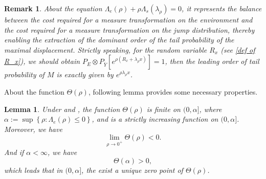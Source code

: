 \documentclass[]{article}
\numberwithin{equation}{section}
\theoremstyle{thmstyleone}%
\theoremstyle{thmstyletwo}%
\newtheorem{remark}{Remark}%
\theoremstyle{thmstylethree}%
\theoremstyle{thmstylefour}%
\newtheorem{lemma}{Lemma}
\theoremstyle{thmstylefive}%
\theoremstyle{thmstylesix}%
\begin{document}
	\begin{remark}
		About the equation $\Lambda_e(\rho)+ \rho \Lambda_s(\lambda_\rho)=0$, it represents the balance between the cost required for a measure transformation on the environment and the cost required for a measure transformation on the jump distribution, thereby enabling the extraction of the dominant order of the tail probability of the maximal displacement. Strictly speaking, for the random variable $R_x$ (see \cref{def of R_x}), we should obtain $P_E\otimes P_{\overline{Y}}\left[ e^{\rho(R_x+\lambda_\rho x)} \right] = 1$, then the leading order of tail probability of $M$ is exactly given by $e^{\rho \lambda_\rho x}$.
	\end{remark}
	
	About the function $\varTheta(\rho)$, following lemma provides some necessary properties.
	\begin{lemma}\label{Classify}
		Under and ,
		the function $\varTheta(\rho)$ is finite on $(0,\alpha]$, where $\alpha:=\sup\left\{\rho:\Lambda_e(\rho)\leqslant 0\right\}$, and is a strictly increasing function on $(0,\alpha]$. Moreover, we have 
		\begin{equation}
			\lim\limits_{\rho\rightarrow 0^+} \varTheta(\rho)<0.
		\end{equation}
		And if $\alpha<\infty$, we have
		\begin{equation}
			\varTheta(\alpha)>0,
		\end{equation}
		which leads that in $ (0,\alpha] $, the exist a unique zero point of $\varTheta(\rho)$.
	\end{lemma}
	
\end{document}
